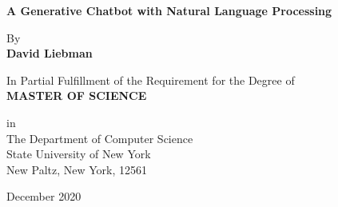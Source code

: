 \documentclass[notitlepage]{report}
\begin{document}

\begin{center}
	


{\Huge \textbf{A Generative Chatbot with Natural Language Processing } 

}

\vspace{5cm}

{By \\ \textbf{David Liebman } }

\vspace{1cm}

In Partial Fulfillment of the Requirement for the Degree of \\

\textbf{MASTER OF SCIENCE }   

\vspace{3cm}


{\large in \\
The Department of Computer Science \\
State University of New York \\ 
New Paltz, New York, 12561   }

\vspace{3cm}

{\large December 2020}

		

\end{center}

\newpage
\end{document}

